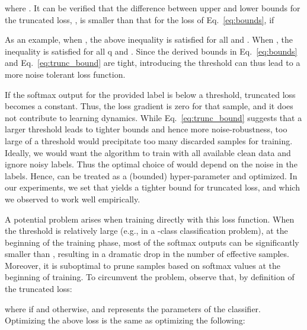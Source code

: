 \documentclass{article}
\begin{document}
where . It can be verified that the difference between upper and lower bounds for the truncated  loss, , is smaller than that for the  loss of Eq.~\ref{eq:bounds}, if 

As an example, when , the above inequality is satisfied for all  and . When , the inequality is satisfied for all q and . Since the derived bounds in Eq.~\ref{eq:bounds} and Eq.~\ref{eq:trunc_bound} are tight, introducing the threshold  can thus lead to a more noise tolerant loss function.

If the softmax output for the provided label is below a threshold, truncated  loss becomes a constant. 
Thus, the loss gradient is zero for that sample, and it does not contribute to learning dynamics. 
While Eq.~\ref{eq:trunc_bound} suggests that a larger threshold  leads to tighter bounds and hence more noise-robustness, too large of a threshold would precipitate too many discarded samples for training. 
Ideally, we would want the algorithm to train with all available clean data and ignore noisy labels. 
Thus the optimal choice of  would depend on the noise in the labels.
Hence,  can be treated as a (bounded) hyper-parameter and optimized.
In our experiments, we set  that yields a tighter bound for truncated  loss, and which we observed to work well empirically.


A potential problem arises when training directly with this loss function. When the threshold is relatively large (e.g.,  in a -class classification problem), at the beginning of the training phase, most of the softmax outputs can be significantly smaller than , resulting in a dramatic drop in the number of effective samples. 
Moreover, it is suboptimal to prune samples based on softmax values at the beginning of training. 
To circumvent the problem, observe that, by definition of the truncated  loss:

where  if  and  otherwise, and  represents the parameters of the classifier. 
Optimizing the above loss is the same as optimizing the following:
\end{document}
